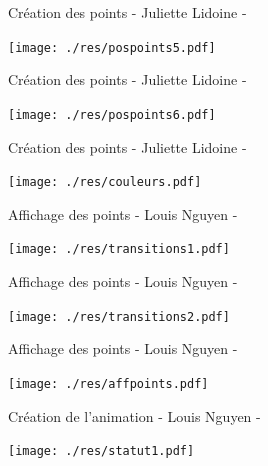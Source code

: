 \documentclass[aspectratio=169]{beamer}
\begin{document}
\begin{frame}[fragile=singleslide]{Création des points \qquad \qquad \qquad \qquad \qquad \qquad \qquad - Juliette Lidoine -}
    \begin{center}
        \texttt{[image: ./res/pospoints5.pdf]}
    \end{center}
\end{frame}

\begin{frame}[fragile=singleslide]{Création des points \qquad \qquad \qquad \qquad \qquad \qquad \qquad - Juliette Lidoine -}
    \begin{center}
        \texttt{[image: ./res/pospoints6.pdf]}
    \end{center}
\end{frame}

\begin{frame}[fragile=singleslide]{Création des points \qquad \qquad \qquad \qquad \qquad \qquad \qquad - Juliette Lidoine -}
    \begin{center}
        \texttt{[image: ./res/couleurs.pdf]}
    \end{center}
\end{frame}

\begin{frame}[fragile=singleslide]{Affichage des points \qquad \qquad \qquad \qquad \qquad \qquad \qquad - Louis Nguyen -}
    \begin{center}
        \texttt{[image: ./res/transitions1.pdf]}
    \end{center}
\end{frame}


\begin{frame}[fragile=singleslide]{Affichage des points \qquad \qquad \qquad \qquad \qquad \qquad \qquad - Louis Nguyen -}
    \begin{center}
        \texttt{[image: ./res/transitions2.pdf]}
    \end{center}
\end{frame}


\begin{frame}[fragile=singleslide]{Affichage des points \qquad \qquad \qquad \qquad \qquad \qquad \qquad - Louis Nguyen -}
    \begin{center}
        \texttt{[image: ./res/affpoints.pdf]}
    \end{center}
\end{frame}


\begin{frame}[fragile=singleslide]{Création de l'animation \qquad \qquad \qquad \qquad \qquad \qquad - Louis Nguyen -}
    \begin{center}
        \texttt{[image: ./res/statut1.pdf]}
    \end{center}
\end{frame}
\end{document}
